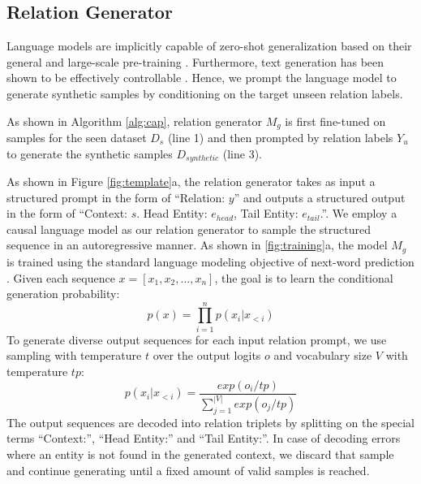 \documentclass[11pt]{article}
\newcommand{\flag}[1]{#1}
\begin{document}
\subsection{Relation Generator}
Language models are implicitly capable of zero-shot generalization based on their general and large-scale pre-training \cite{radford2019language}.
Furthermore, text generation has been shown to be effectively controllable \cite{keskar2019ctrl}.
Hence, we prompt the language model to generate synthetic samples by conditioning on the target unseen relation labels.
\flag{
As shown in Algorithm \ref{alg:cap}, relation generator $M_g$ is first fine-tuned on samples for the seen dataset $D_{s}$ (line 1) and then prompted by relation labels $Y_u$ to generate the synthetic samples $D_{synthetic}$ (line 3).
}
As shown in Figure \ref{fig:template}a, the relation generator takes as input a structured prompt in the form of ``Relation: $y$'' and outputs a structured output in the form of ``Context: $s$. Head Entity: $e_{head}$, Tail Entity: $e_{tail}$.''. We employ a causal language model as our relation generator to sample the structured sequence in an autoregressive manner.
As shown in \ref{fig:training}a, the model $M_{g}$ is trained using the standard language modeling objective of next-word prediction \cite{bengio2003neural}.
Given each sequence $x = [x_1, x_2, ..., x_n]$, the goal is to learn the conditional generation probability:
\begin{equation}
    p(x) = \prod_{i=1}^{n} p(x_{i} | x_{<i})
\end{equation}
To generate diverse output sequences for each input relation prompt, we use sampling with temperature $t$ \cite{Hinton2015DistillingTK} over the output logits $o$ and vocabulary size $V$ with temperature $tp$:
\begin{equation}
    p(x_i | x_{<i}) = \frac{exp(o_{i} / tp)}{\sum_{j=1}^{|V|} exp(o_{j} / tp)}
\end{equation}
The output sequences are decoded into relation triplets by splitting on the special terms ``Context:'', ``Head Entity:'' and ``Tail Entity:''.
In case of decoding errors where an entity is not found in the generated context, we discard that sample and continue generating until a fixed amount of valid samples is reached.
\end{document}
